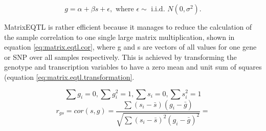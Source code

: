 $$ g = \alpha + \beta s + \epsilon, \text{ where } \epsilon \sim \text{ i.i.d. } N(0, \sigma^2).$$


MatrixEQTL is rather efficient because it manages to reduce the calculation of the sample correlation to one single large matrix multiplication, shown in equation \ref{eq:matrix.eqtl.cor}, where g and s are vectors of all values for one gene or SNP over all samples respectively. This is achieved by transforming the genotype and transcription variables to have a zero mean and unit sum of squares (equation \ref{eq:matrix.eqtl.transformation}.


\begin{equation}
\label{eq:matrix.eqtl.transformation}
\sum g_i = 0, \sum g_i^2 = 1, \sum s_i = 0, \sum s_i^2 = 1
\end{equation}
\begin{equation}
\label{eq:matrix.eqtl.cor}
r_{gs} = cor(s, g) = \frac{\sum (s_i - \bar{s})(g_i - \bar{g})}{\sqrt{\sum (s_i - \bar{s})^2(g_i - \bar{g})^2}} = 
\end{equation}